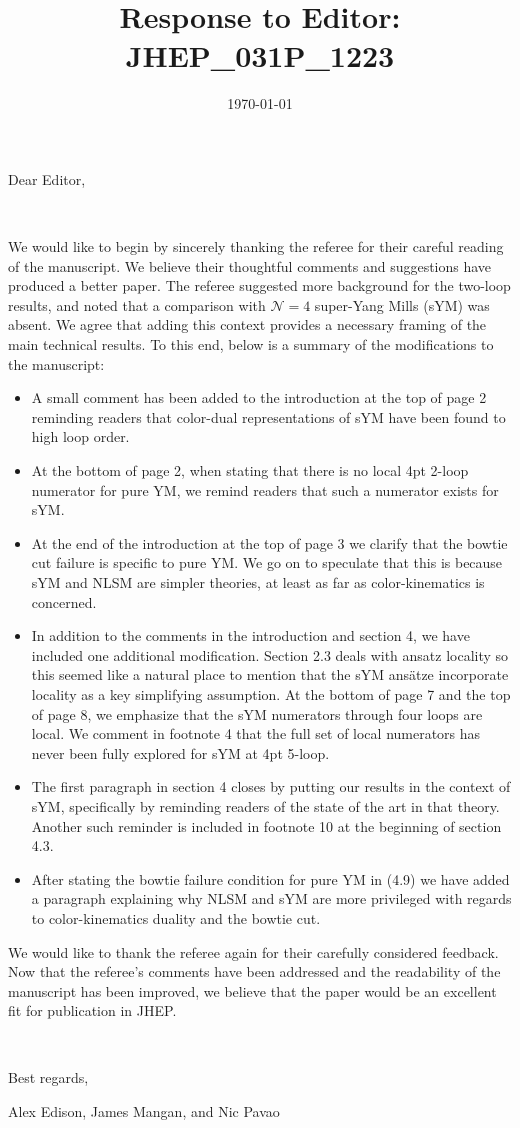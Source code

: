 \documentclass[notitlepage, 12pt]{revtex4-1}
\begin{document}
\title{Response to Editor: JHEP\_031P\_1223}

\date{\today}

\maketitle
Dear Editor, 

\

We would like to begin by sincerely thanking the referee for their careful reading of the manuscript.
We believe their thoughtful comments and suggestions have produced a better paper.
The referee suggested more background for the two-loop results, and noted that a comparison with $\mathcal{N}=4$ super-Yang Mills (sYM) was absent. We agree that adding this context provides a necessary framing of the main technical results.
To this end, below is a summary of the modifications to the manuscript:
\begin{itemize}
\item A small comment has been added to the introduction at the top of page 2 reminding readers that color-dual representations of sYM have been found to high loop order.
\item At the bottom of page 2, when stating that there is no local 4pt 2-loop numerator for pure YM, we remind readers that such a numerator exists for sYM.
\item At the end of the introduction at the top of page 3 we clarify that the bowtie cut failure is specific to pure YM.
We go on to speculate that this is because sYM and NLSM are simpler theories, at least as far as color-kinematics is concerned.
\item In addition to the comments in the introduction and section 4, we have included one additional modification.
Section 2.3 deals with ansatz locality so this seemed like a natural place to mention that the sYM ans\"atze incorporate locality as a key simplifying assumption.
At the bottom of page 7 and the top of page 8, we emphasize that the sYM numerators through four loops are local.
We comment in footnote 4 that the full set of local numerators has never been fully explored for sYM at 4pt 5-loop.
\item The first paragraph in section 4 closes by putting our results in the context of sYM, specifically by reminding readers of the state of the art in that theory. Another such reminder is included in footnote 10 at the beginning of section 4.3. 
\item After stating the bowtie failure condition for pure YM in (4.9) we have added a paragraph explaining why NLSM and sYM are more privileged with regards to color-kinematics duality and the bowtie cut. 
\end{itemize}


We would like to thank the referee again for their carefully considered feedback.
Now that the referee's comments have been addressed and the readability of the manuscript has been improved, we believe that the paper would be an excellent fit for publication in JHEP.

\

Best regards,

Alex Edison, James Mangan, and Nic Pavao
\end{document}
